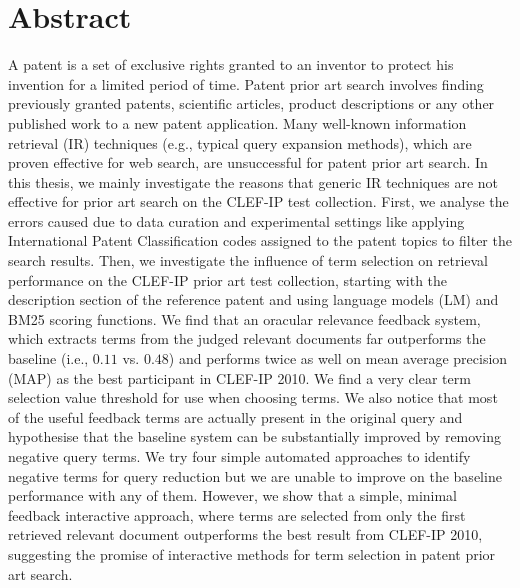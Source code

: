 \chapter*{Abstract}
\vspace{-1em}
A patent is a set of exclusive rights granted to an inventor to protect 
his invention for a limited period of time. Patent prior art search involves 
finding previously granted patents, 
scientific articles, product descriptions or any other published work 
to a new patent application.
Many well-known information retrieval (IR) techniques (e.g., typical query expansion methods), which are proven effective 
for web search, are unsuccessful for patent 
prior art search.
In this thesis, we mainly investigate the reasons that generic IR techniques are not 
effective for prior art search on the CLEF-IP test collection.   
First, we analyse the errors caused due to data curation and experimental settings 
like applying International Patent Classification codes assigned to the patent topics 
to filter the search results.  
Then, we investigate the influence of term selection on retrieval
performance on the CLEF-IP prior art test collection, starting with
the description section of the reference patent and using language models (LM) and BM25
scoring functions. We find that an oracular relevance feedback system,
which extracts terms from the judged relevant documents far
outperforms the baseline (i.e., $0.11$ vs. $ 0.48 $) and performs twice as well on mean average precision (MAP) as the best
participant in CLEF-IP 2010. We find a very clear term selection value
threshold for use when choosing terms.  We also notice that most of
the useful feedback terms are actually present in the original query
and hypothesise that the baseline system can be substantially
improved by removing negative query terms.
We try four simple automated approaches to identify negative terms
for query reduction but we are unable to improve on the baseline
performance with any of them. However, we show that a
simple, minimal feedback interactive approach, where terms are selected
from only the first retrieved relevant document outperforms the best
result from CLEF-IP 2010, suggesting the promise of interactive methods
for term selection in patent prior art search.

